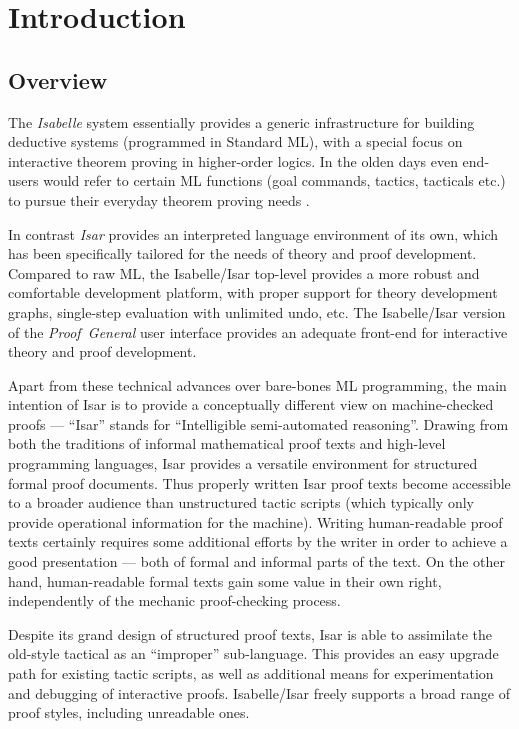 
\chapter{Introduction}

\section{Overview}

The \emph{Isabelle} system essentially provides a generic infrastructure for
building deductive systems (programmed in Standard ML), with a special focus
on interactive theorem proving in higher-order logics.  In the olden days even
end-users would refer to certain ML functions (goal commands, tactics,
tacticals etc.) to pursue their everyday theorem proving needs
\cite{isabelle-intro,isabelle-ref}.
  
In contrast \emph{Isar} provides an interpreted language environment of its
own, which has been specifically tailored for the needs of theory and proof
development.  Compared to raw ML, the Isabelle/Isar top-level provides a more
robust and comfortable development platform, with proper support for theory
development graphs, single-step evaluation with unlimited undo, etc.  The
Isabelle/Isar version of the \emph{Proof~General} user interface
\cite{proofgeneral,Aspinall:TACAS:2000} provides an adequate front-end for
interactive theory and proof development.

\medskip Apart from these technical advances over bare-bones ML programming,
the main intention of Isar is to provide a conceptually different view on
machine-checked proofs \cite{Wenzel:1999:TPHOL, Wenzel-PhD} --- ``Isar''
stands for ``Intelligible semi-automated reasoning''.  Drawing from both the
traditions of informal mathematical proof texts and high-level programming
languages, Isar provides a versatile environment for structured formal proof
documents.  Thus properly written Isar proof texts become accessible to a
broader audience than unstructured tactic scripts (which typically only
provide operational information for the machine).  Writing human-readable
proof texts certainly requires some additional efforts by the writer in order
to achieve a good presentation --- both of formal and informal parts of the
text.  On the other hand, human-readable formal texts gain some value in their
own right, independently of the mechanic proof-checking process.

Despite its grand design of structured proof texts, Isar is able to assimilate
the old-style tactical as an ``improper'' sub-language.  This provides an easy
upgrade path for existing tactic scripts, as well as additional means for
experimentation and debugging of interactive proofs.  Isabelle/Isar freely
supports a broad range of proof styles, including unreadable ones.

